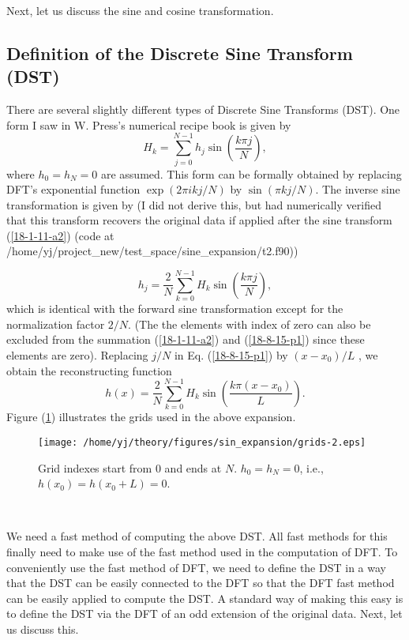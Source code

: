 \documentclass{article}
\begin{document}
Next, let us discuss the sine and cosine transformation.

\subsection{Definition of the Discrete Sine Transform (DST)}

There are several slightly different types of Discrete Sine Transforms (DST).
One form I saw in W. Press's numerical recipe book is given by
\begin{equation}
  \label{18-1-11-a2} H_k = \sum_{j = 0}^{N - 1} h_j \sin \left( \frac{k \pi
  j}{N} \right),
\end{equation}
where $h_0 = h_N = 0$ are assumed. This form can be formally obtained by
replacing DFT's exponential function $\exp (2 \pi i k j / N)$ by $\sin (\pi k
j / N)$. The inverse sine transformation is given by (I did not derive this,
but had numerically verified that this transform recovers the original data if
applied after the sine transform (\ref{18-1-11-a2}) (code at
/home/yj/project\_new/test\_space/sine\_expansion/t2.f90))


\begin{equation}
  \label{18-8-15-p1} h_j = \frac{2}{N} \sum_{k = 0}^{N - 1} H_k \sin \left(
  \frac{k \pi j}{N} \right),
\end{equation}
which is identical with the forward sine transformation except for the
normalization factor $2 / N$. (The the elements with index of zero can also be
excluded from the summation (\ref{18-1-11-a2}) and (\ref{18-8-15-p1}) since
these elements are zero). Replacing $j / N$ in Eq. (\ref{18-8-15-p1}) by $(x -
x_0) / L$ , we obtain the reconstructing function
\begin{equation}
  h (x) = \frac{2}{N} \sum_{k = 0}^{N - 1} H_k \sin \left( \frac{k \pi (x -
  x_0)}{L} \right) .
\end{equation}
Figure (\ref{18-8-15-p3}) illustrates the grids used in the above expansion.

\begin{figure}[h]
  \texttt{[image: /home/yj/theory/figures/sin\_expansion/grids-2.eps]}
  \caption{\label{18-8-15-p3}Grid indexes start from $0$ and ends at $N$. $h_0
  = h_N = 0$, i.e., $h (x_0) = h (x_0 + L) = 0$.}
\end{figure}

\

We need a fast method of computing the above DST. All fast methods for this
finally need to make use of the fast method used in the computation of DFT. To
conveniently use the fast method of DFT, we need to define the DST in a way
that the DST can be easily connected to the DFT so that the DFT fast method
can be easily applied to compute the DST. A standard way of making this easy
is to define the DST via the DFT of an odd extension of the original data.
Next, let us discuss this.
\end{document}
